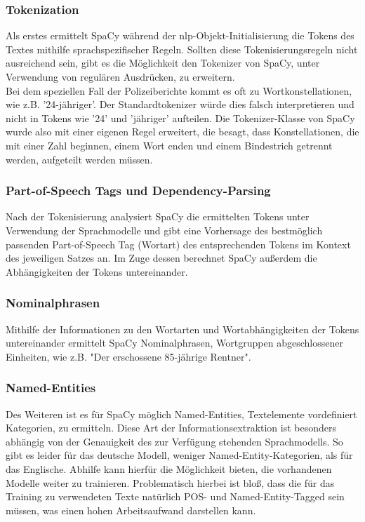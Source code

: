 \subsubsection{Tokenization}
Als erstes ermittelt SpaCy während der nlp-Objekt-Initialisierung die Tokens des Textes mithilfe sprachspezifischer Regeln. Sollten diese Tokenisierungsregeln nicht ausreichend sein, gibt es die Möglichkeit den Tokenizer von SpaCy, unter Verwendung von regulären Ausdrücken, zu erweitern. 
\\Bei dem speziellen Fall der Polizeiberichte kommt es oft zu Wortkonstellationen, wie z.B. '24-jähriger'. Der Standardtokenizer würde dies falsch interpretieren und nicht in Tokens wie '24' und 'jähriger' aufteilen. Die Tokenizer-Klasse von SpaCy wurde also mit einer eigenen Regel erweitert, die besagt, dass Konstellationen, die mit einer Zahl beginnen, einem Wort enden und einem Bindestrich getrennt werden, aufgeteilt werden müssen.

\subsubsection{Part-of-Speech Tags und Dependency-Parsing}
Nach der Tokenisierung analysiert SpaCy die ermittelten Tokens unter Verwendung der Sprachmodelle und gibt eine Vorhersage des bestmöglich passenden Part-of-Speech Tag (Wortart) des entsprechenden Tokens im Kontext des jeweiligen Satzes an. Im Zuge dessen berechnet SpaCy außerdem die Abhängigkeiten der Tokens untereinander.

\subsubsection{Nominalphrasen}
Mithilfe der Informationen zu den Wortarten und Wortabhängigkeiten der Tokens untereinander ermittelt SpaCy Nominalphrasen, Wortgruppen abgeschlossener Einheiten, wie z.B. "Der erschossene 85-jährige Rentner".  

\subsubsection{Named-Entities}
Des Weiteren ist es für SpaCy möglich Named-Entities, Textelemente vordefiniert Kategorien, zu ermitteln. Diese Art der Informationsextraktion ist besonders abhängig von der Genauigkeit des zur Verfügung stehenden Sprachmodells. So gibt es leider für das deutsche Modell, weniger Named-Entity-Kategorien, als für das Englische. Abhilfe kann hierfür die Möglichkeit bieten, die vorhandenen Modelle weiter zu trainieren. Problematisch hierbei ist bloß, dass die für das Training zu verwendeten Texte natürlich POS- und Named-Entity-Tagged sein müssen, was einen hohen Arbeitsaufwand darstellen kann.

